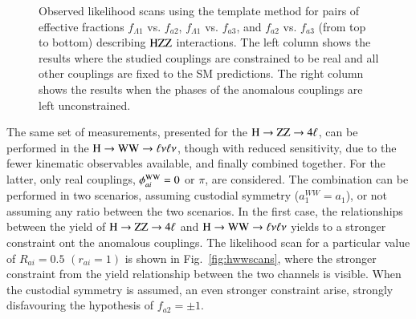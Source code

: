 \begin{enumerate}
\begin{figure}[!htbp]
\begin{center}
        \caption{
        Observed likelihood scans using the template method for pairs of effective fractions $f_{\Lambda1}$ vs. $f_{a2}$, 
        $f_{\Lambda1}$ vs. $f_{a3}$, and $f_{a2}$ vs. $f_{a3}$ (from top to bottom) describing $\mathrm{H}\mathrm{Z}\mathrm{Z}$ interactions. 
        The left column shows the results where the studied couplings are constrained to be real
        and all other couplings are fixed to the SM predictions.
        The right column shows the results when the phases of the anomalous couplings are left unconstrained. 
        \label{fig:results_ZZ_2D}
        }
\end{center}
\end{figure}

\end{enumerate}

The same set of measurements, presented for the $\mathrm{H}\to\mathrm{Z}\mathrm{Z}\to4\ell$, can be
performed in the $\mathrm{H}\to\mathrm{W}\mathrm{W}\to\ell\nu\ell\nu$, though with reduced sensitivity, due to
the fewer kinematic observables available, and finally combined
together. For the latter, only real couplings, $\phi_{ai}^{\mathrm{W}\mathrm{W}}=0$
or $\pi$, are considered. The combination can be performed in two
scenarios, assuming custodial symmetry ($a_1^{WW} = a_1$), or not
assuming any ratio between the two scenarios. In the first case, the
relationships between the yield of $\mathrm{H}\to\mathrm{Z}\mathrm{Z}\to4\ell$ and $\mathrm{H}\to\mathrm{W}\mathrm{W}\to\ell\nu\ell\nu$ yields to
a stronger constraint ont the anomalous couplings.
The likelihood scan for a particular value of $R_{ai}=0.5$ $(r_{ai} = 1)$
is shown in Fig.~\ref{fig:hwwscans}, where the stronger constraint from 
the yield relationship between the two channels is visible. When the custodial
symmetry is assumed, an even stronger constraint arise, strongly disfavouring 
the hypothesis of $f_{a2}=\pm1$.
%

